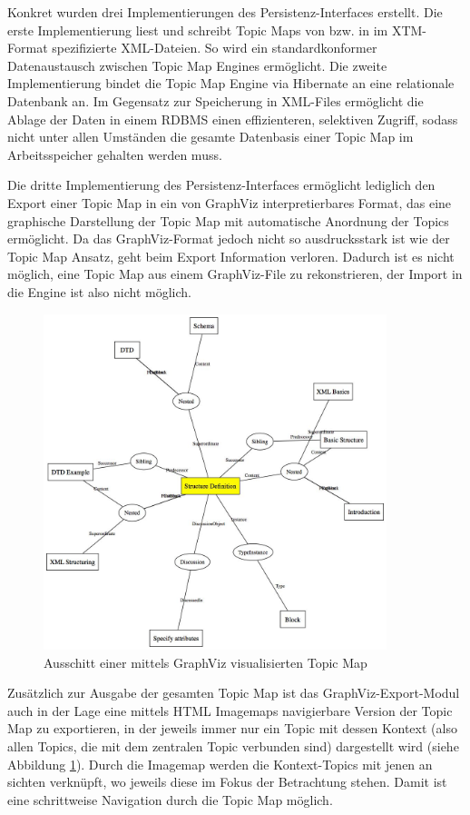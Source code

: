 Konkret wurden drei Implementierungen des Persistenz-Interfaces erstellt. Die erste Implementierung liest und schreibt Topic Maps von bzw. in im \gls{XTM}-Format \citep{XTM06} spezifizierte \gls{XML}-Dateien. So wird ein standardkonformer Datenaustausch zwischen Topic Map Engines ermöglicht. Die zweite Implementierung bindet die Topic Map Engine via Hibernate \citep{Hibernate07} an eine relationale Datenbank an. Im Gegensatz zur Speicherung in \gls{XML}-Files ermöglicht die Ablage der Daten in einem \gls{RDBMS} einen effizienteren, selektiven Zugriff, sodass nicht unter allen Umständen die gesamte Datenbasis einer Topic Map im Arbeitsspeicher gehalten werden muss.

Die dritte Implementierung des Persistenz-Interfaces ermöglicht lediglich den Export einer Topic Map in ein von GraphViz \citep{Ellson02} interpretierbares Format, das eine graphische Darstellung der Topic Map mit automatische Anordnung der Topics ermöglicht. Da das GraphViz-Format jedoch nicht so ausdrucksstark ist wie der Topic Map Ansatz, geht beim Export Information verloren. Dadurch ist es nicht möglich, eine Topic Map aus einem GraphViz-File zu rekonstrieren, der Import in die Engine ist also nicht möglich. 

\begin{figure}[htbp]
	\centering
		\includegraphics[width=10cm]{img/Persistenz/GraphVizExample.jpg}
	\caption{Ausschitt einer mittels GraphViz visualisierten Topic Map}
	\label{fig:img_Persistenz_GraphViz}
\end{figure}

Zusätzlich zur Ausgabe der gesamten Topic Map ist das GraphViz-Export-Modul auch in der Lage eine mittels HTML Imagemaps navigierbare Version der Topic Map zu exportieren, in der jeweils immer nur ein Topic mit dessen Kontext (also allen Topics, die mit dem zentralen Topic verbunden sind) dargestellt wird (siehe Abbildung \ref{fig:img_Persistenz_GraphViz}). Durch die Imagemap werden die Kontext-Topics mit jenen an sichten verknüpft, wo jeweils diese im Fokus der Betrachtung stehen. Damit ist eine schrittweise Navigation durch die Topic Map möglich.

